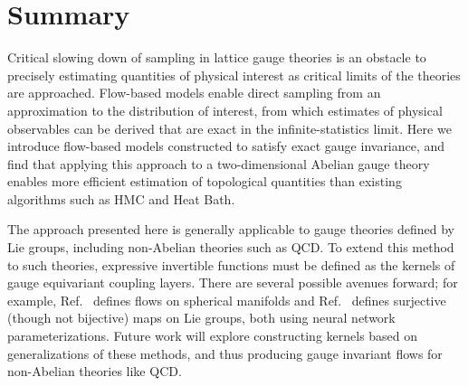 \section{Summary}
Critical slowing down of sampling in lattice gauge theories is an obstacle to precisely estimating quantities of physical interest as critical limits of the theories are approached. Flow-based models enable direct sampling from an approximation to the distribution of interest, from which estimates of physical observables can be derived that are exact in the infinite-statistics limit. Here we introduce flow-based models constructed to satisfy exact gauge invariance, and find that applying this approach to a two-dimensional Abelian gauge theory enables more efficient estimation of topological quantities than existing algorithms such as HMC and Heat Bath.

The approach presented here is generally applicable to gauge theories defined by Lie groups, including non-Abelian theories such as QCD. To extend this method to such theories, expressive invertible functions must be defined as the kernels of gauge equivariant coupling layers. There are several possible avenues forward; for example, Ref.~\cite{rezende2020normalizing} defines flows on spherical manifolds and Ref.~\cite{falorsi19lie} defines surjective (though not bijective) maps on Lie groups, both using neural network parameterizations. Future work will explore constructing kernels based on generalizations of these methods, and thus producing gauge invariant flows for non-Abelian theories like QCD.
